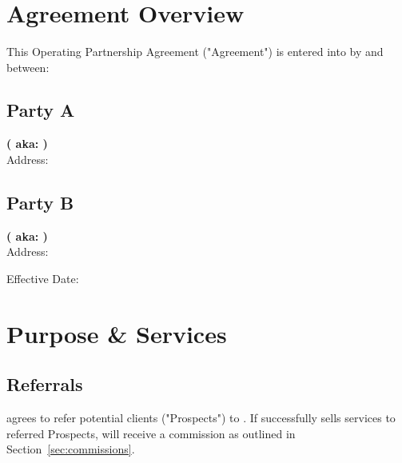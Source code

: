 \documentclass[12pt]{article}
\begin{document}
\thispagestyle{firstpage}

\begin{center}
{\Large\textbf{\partyA}\\
\partyAaddress}\\[2em]
\end{center}

\begin{center}
  {\Large\bfseries \agreementTitle}\\[0.5em]
\end{center}

\markboth{\agreementShortTitle}{\agreementShortTitle}


\section{Agreement Overview}
This Operating Partnership Agreement ("Agreement") is entered into by and between:

\subsection*{Party A}
\textbf{\partyA  ( aka: \partyAshort)}\\
Address: \textbf{\partyAaddress}

\subsection*{Party B}
\textbf{\partyB ( aka: \partyBshort)}\\
Address: \textbf{\partyBaddress}

Effective Date: \textbf{\effectiveDate}

\newpage

\section{Purpose \& Services}
\subsection{Referrals}
\partyAshort{} agrees to refer potential clients ("Prospects") to \partyBshort{}.  
If \partyBshort{} successfully sells services to referred Prospects, \partyAshort{} will receive a commission as outlined in Section~\ref{sec:commissions}.
\end{document}
